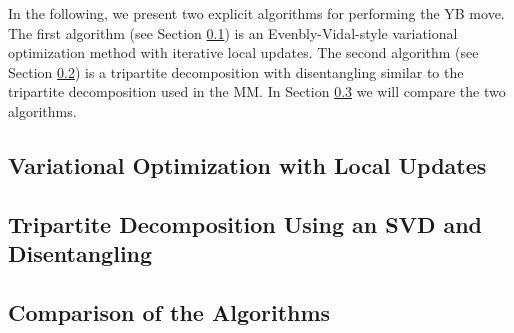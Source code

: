 In the following, we present two explicit algorithms for performing the YB move. The first algorithm (see Section \ref{sec:YB_move_iterative_local_optimization}) is an Evenbly-Vidal-style variational optimization method with iterative local updates. The second algorithm (see Section \ref{sec:YB_move_svd_disentangle}) is a tripartite decomposition with disentangling similar to the tripartite decomposition used in the MM. In Section \ref{sec:YB_move_comparison} we will compare the two algorithms.

\subsection{Variational Optimization with Local Updates}
\label{sec:YB_move_iterative_local_optimization}


\subsection{Tripartite Decomposition Using an SVD and Disentangling}
\label{sec:YB_move_svd_disentangle}


\subsection{Comparison of the Algorithms}
\label{sec:YB_move_comparison}
